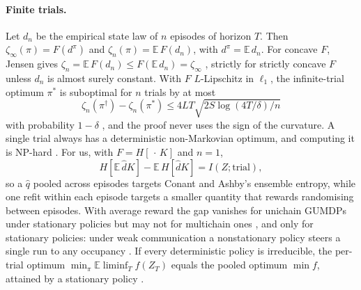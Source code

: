 \documentclass[10pt]{article}
\newcommand{\dpi}{d^\pi}
\begin{document}
\paragraph{Finite trials.}
Let $d_n$ be the empirical state law of $n$ episodes of horizon $T$. Then $\zeta_\infty(\pi)=F(\dpi)$ and $\zeta_n(\pi)=\mathbb{E}\,F(d_n)$, with $\dpi=\mathbb{E}\,d_n$. For concave $F$, Jensen gives $\zeta_n=\mathbb{E}\,F(d_n)\le F(\mathbb{E}\,d_n)=\zeta_\infty$ \citep[proof of Thm.~1]{Mutti-convex23}, strictly for strictly concave $F$ unless $d_n$ is almost surely constant. With $F$ $L$-Lipschitz in $\ell_1$, the infinite-trial optimum $\pi^*$ is suboptimal for $n$ trials by at most
\[
\zeta_n(\pi^\dagger)-\zeta_n(\pi^*) \le 4LT\sqrt{2S\log(4T/\delta)/n}
\]
with probability $1-\delta$ \citep[Thm.~4.1]{Mutti-challenging22}, and the proof never uses the sign of the curvature. A single trial always has a deterministic non-Markovian optimum, and computing it is NP-hard \citep[Lemma~1, Thm.~4]{Mutti-convex23}. For us, with $F=H[\,\cdot\,K]$ and $n=1$,
\[
H[\mathbb{E}\,\hat d K] - \mathbb{E}\,H[\hat d K] = I(Z;\text{trial}),
\]
so a $\hat q$ pooled across episodes targets Conant and Ashby's ensemble entropy, while one refit within each episode targets a smaller quantity that rewards randomising between episodes. With average reward the gap vanishes for unichain GUMDPs under stationary policies but may not for multichain ones \citep[Thms.~4.4 and 4.5]{Santos-number25}, and only for stationary policies: under weak communication a nonstationary policy steers a single run to any occupancy \citep[Thm.~4.1]{Mannor-empirical05}. If every deterministic policy is irreducible, the per-trial optimum $\min_\pi\mathbb{E}\liminf_T f(Z_T)$ equals the pooled optimum $\min f$, attained by a stationary policy \citep[Thm.~5]{Derman-finite70ch7}.
\end{document}
